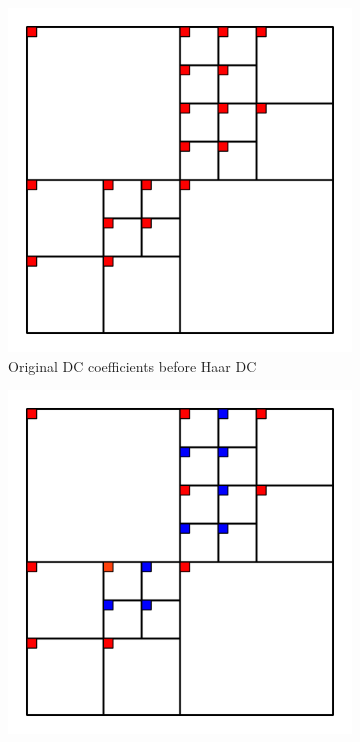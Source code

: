 \documentclass[english,conference,10pt]{IEEEtran}
\begin{document}
\begin{figure}
\centering
\begin{subfigure}[t]{0.49\columnwidth}
\includegraphics[width=\columnwidth]{block32_L0}
\caption{Original DC coefficients before Haar DC}
\end{subfigure}
\begin{subfigure}[t]{0.49\columnwidth}
\includegraphics[width=\columnwidth]{block32_L1}

\end{subfigure}
\end{figure}
\end{document}
